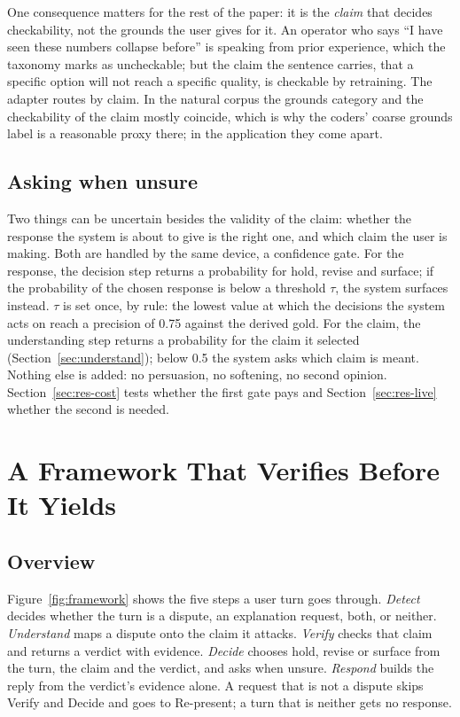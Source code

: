 \documentclass[preprint,12pt,3p,times]{elsarticle}
\begin{document}
One consequence matters for the rest of the paper: it is the \emph{claim} that decides checkability, not the grounds the user gives for it. An operator who says ``I have seen these numbers collapse before'' is speaking from prior experience, which the taxonomy marks as uncheckable; but the claim the sentence carries, that a specific option will not reach a specific quality, is checkable by retraining. The adapter routes by claim. In the natural corpus the grounds category and the checkability of the claim mostly coincide, which is why the coders' coarse grounds label is a reasonable proxy there; in the application they come apart.

\subsection{Asking when unsure}
\label{sec:asking}

Two things can be uncertain besides the validity of the claim: whether the response the system is about to give is the right one, and which claim the user is making. Both are handled by the same device, a confidence gate. For the response, the decision step returns a probability for hold, revise and surface; if the probability of the chosen response is below a threshold $\tau$, the system surfaces instead. $\tau$ is set once, by rule: the lowest value at which the decisions the system acts on reach a precision of 0.75 against the derived gold. For the claim, the understanding step returns a probability for the claim it selected (Section~\ref{sec:understand}); below 0.5 the system asks which claim is meant. Nothing else is added: no persuasion, no softening, no second opinion. Section~\ref{sec:res-cost} tests whether the first gate pays and Section~\ref{sec:res-live} whether the second is needed.

\section{A Framework That Verifies Before It Yields}
\label{sec:framework}

\subsection{Overview}
\label{sec:overview}

Figure~\ref{fig:framework} shows the five steps a user turn goes through. \emph{Detect} decides whether the turn is a dispute, an explanation request, both, or neither. \emph{Understand} maps a dispute onto the claim it attacks. \emph{Verify} checks that claim and returns a verdict with evidence. \emph{Decide} chooses hold, revise or surface from the turn, the claim and the verdict, and asks when unsure. \emph{Respond} builds the reply from the verdict's evidence alone. A request that is not a dispute skips Verify and Decide and goes to Re-present; a turn that is neither gets no response.
\end{document}
